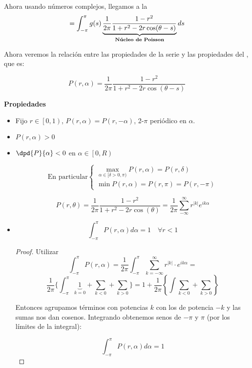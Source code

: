 		Ahora usando números complejos, llegamos a la 
		\[ = \int^{\pi}_{-\pi} g(s) \underbrace{\frac{1}{2\pi} \frac{1-r^2}{1+r^2-2r\cos (\theta - s)}}_{\text{\bf Núcleo de Poisson}} ds \]

		Ahora veremos la relación entre las propiedades de la serie y las propiedades del , que es:

		\[P(r,\alpha) = \frac{1}{2\pi} \frac{1-r^2}{1+r^2-2r\cos (\theta - s)} \]



		\textbf{Propiedades}

		\begin{itemize}

			\item Fijo $r \in \left[ 0,1 \right)$, $P(r,\alpha) = P(r,-\alpha)$, 2-$\pi$ periódico en $\alpha$.

			\item $P(r,\alpha) > 0$

			\item $\dpd{P}{\alpha} < 0$ en $\alpha \in \left[ 0,R \right)$

			\[ \text{En particular} \begin{cases}
				\max_{\alpha \in [\delta > 0, \pi)} P(r,\alpha) = P(r,\delta) \\
				\min P(r,\alpha) = P(r,\pi) = P(r,-\pi)
			\end{cases} \]

			\obs \[ P(r, \theta) = \frac{1}{2\pi}\frac{1-r^2}{1+r^2-2r \cos(\theta)} = \frac{1}{2\pi} \sum_{-\infty}^\infty r^{|k|} e^{i k \alpha} \]

			\item \[
				\int_{-\pi}^\pi P(r, \alpha) d\alpha = 1 \quad \forall r < 1
			\]

			\begin{proof}
				Utilizar \[ \int_{-\pi}^\pi P(r, \alpha) = \frac{1}{2\pi} \int_{-\pi}^\pi \sum_{k=-\infty}^{\infty} r^{|k|} \cdot e^{ik\alpha}  = \]
				\[ \frac{1}{2\pi} \{ \int_{-\pi}^{\pi} \underbrace{1}_{k=0}  + \sum_{k<0} + \sum_{k>0} \} = 1 + \frac{1}{2\pi} \left\{ \int \sum_{k<0} + \sum_{k>0} \right\} \]

				Entonces agrupamos términos con potencias $k$ con los de potencia $-k$ y las sumas nos dan cosenos. Integrando obtenemos senos de $-\pi$ y $\pi$ (por los límites de la integral):

				\[\int_{-\pi}^{\pi} P(r, \alpha) d\alpha = 1\]
			\end{proof}



\end{itemize}

